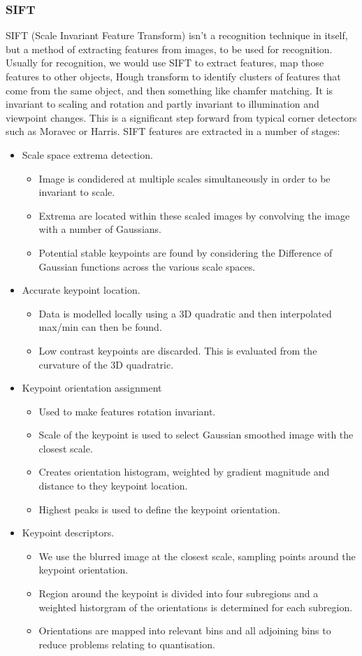 \documentclass[12pt]{report}
\begin{document}
\subsubsection{SIFT}
SIFT (Scale Invariant Feature Transform) isn't a recognition technique in itself, but a method of extracting features from images, to be used for recognition. Usually for recognition, we would use SIFT to extract features, map those features to other objects, Hough transform to identify clusters of features that come from the same object, and then something like chamfer matching. It is invariant to scaling and rotation and partly invariant to illumination and viewpoint changes. This is a significant step forward from typical corner detectors such as Moravec or Harris. SIFT features are extracted in a number of stages:
\begin{itemize}
\item Scale space extrema detection.
\begin{itemize}
\item Image is condidered at multiple scales simultaneously in order to be invariant to scale.
\item Extrema are located within these scaled images by convolving the image with a number of Gaussians.
\item Potential stable keypoints are found by considering the Difference of Gaussian functions across the various scale spaces.
\end{itemize}
\item Accurate keypoint location.
\begin{itemize}
\item Data is modelled locally using a 3D quadratic and then interpolated max/min can then be found.
\item Low contrast keypoints are discarded. This is evaluated from the curvature of the 3D quadratric.
\end{itemize}
\item Keypoint orientation assignment
\begin{itemize}
\item Used to make features rotation invariant.
\item Scale of the keypoint is used to select Gaussian smoothed image with the closest scale.
\item Creates orientation histogram, weighted by gradient magnitude and distance to they keypoint location.
\item Highest peaks is used to define the keypoint orientation.
\end{itemize}
\item Keypoint descriptors.
\begin{itemize}
\item We use the blurred image at the closest scale, sampling points around the keypoint orientation.
\item Region around the keypoint is divided into four subregions and a weighted historgram of the orientations is determined for each subregion.
\item Orientations are mapped into relevant bins and all adjoining bins to reduce problems relating to quantisation.
\end{itemize}
\end{itemize}
\end{document}
